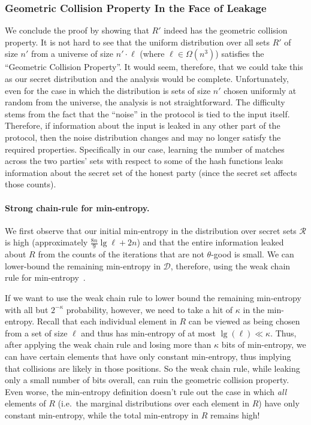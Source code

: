 \subsubsection{Geometric Collision Property In the Face of Leakage}
We conclude the proof by showing that $R'$ indeed has the geometric collision
property. It is not hard to see that the uniform distribution over all sets $R'$
of size $n'$ from a universe of size $n' \cdot \ell$ (where $\ell \in
\Omega(n^3)$) satisfies the ``Geometric Collision Property''.  It would seem,
therefore, that we could take this as our secret distribution and the analysis
would be complete. Unfortunately, even for the case in which the distribution is
sets of size $n'$ chosen uniformly at random from the universe, the analysis is
not straightforward. The difficulty stems from the fact that the ``noise'' in
the protocol is tied to the input itself. Therefore, if information about the
input is leaked in any other part of the protocol, then the noise distribution
changes and may no longer satisfy the required properties.  Specifically in our
case, learning the number of matches across the two parties' sets with respect
to some of the hash functions leaks information about the secret set of the
honest party (since the secret set affects those counts).

\paragraph{Strong chain-rule for min-entropy.}
We first observe that our initial min-entropy in the distribution over
secret sets $\mathcal{R}$ is high (approximately $\frac{8n}{9} \lg \ell + 2n$) and that
the entire information leaked about $R$ from the counts of the
iterations that are not $\theta$-good is small.  We can lower-bound the
remaining min-entropy in $\mathcal{D}$, therefore, using the weak chain
rule for min-entropy~\cite[Lemma 2.2]{DORS08}.

If we want to use the weak chain rule to  lower bound the remaining min-entropy
with all but $2^{-\kappa}$ probability, however, we need to take a hit of
$\kappa$ in the min-entropy. %
Recall that each individual element in $R$ can be viewed as being chosen
from a set of size $\ell$ and thus has min-entropy of at most
$\lg(\ell) \ll \kappa$.  Thus, after applying the weak chain rule and
losing more than $\kappa$ bits of min-entropy, we can have certain
elements that have only constant min-entropy, thus implying that
collisions are likely in those positions. So the weak chain rule, while leaking only a
small number of bits overall, can ruin the geometric collision property.
Even worse, the min-entropy definition doesn't rule out the case in
which \emph{all} elements of $R$ (i.e.~the marginal distributions over
each element in $R$) have only constant min-entropy, while the total
min-entropy in $R$ remains high!

